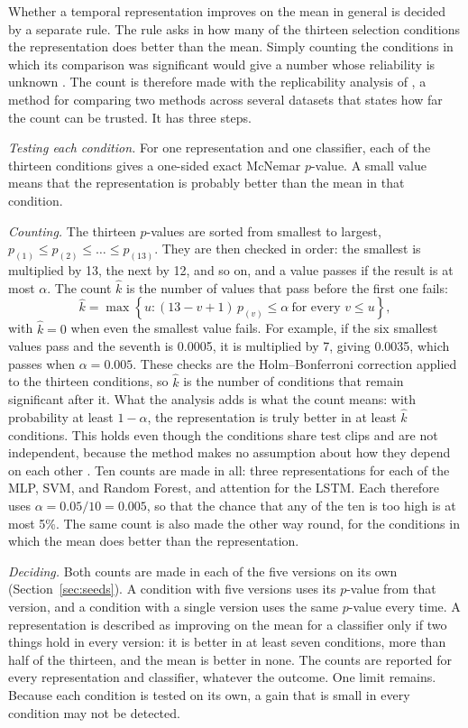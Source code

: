 Whether a temporal representation improves on the mean in general is decided by a separate rule. The rule asks in how many of the thirteen selection conditions the representation does better than the mean. Simply counting the conditions in which its comparison was significant would give a number whose reliability is unknown \cite{demsar2006}. The count is therefore made with the replicability analysis of , a method for comparing two methods across several datasets that states how far the count can be trusted. It has three steps.

\emph{Testing each condition.} For one representation and one classifier, each of the thirteen conditions gives a one-sided exact McNemar $p$-value. A small value means that the representation is probably better than the mean in that condition.

\emph{Counting.} The thirteen $p$-values are sorted from smallest to largest, $p_{(1)} \le p_{(2)} \le \dots \le p_{(13)}$. They are then checked in order: the smallest is multiplied by 13, the next by 12, and so on, and a value passes if the result is at most $\alpha$. The count $\hat{k}$ is the number of values that pass before the first one fails:
\begin{equation}
   \hat{k} = \max \left\{ u : (13 - v + 1)\, p_{(v)} \le \alpha \ \text{for every } v \le u \right\},
   \label{eq:replicability}
\end{equation}
with $\hat{k} = 0$ when even the smallest value fails. For example, if the six smallest values pass and the seventh is 0.0005, it is multiplied by 7, giving 0.0035, which passes when $\alpha = 0.005$. These checks are the Holm--Bonferroni correction applied to the thirteen conditions, so $\hat{k}$ is the number of conditions that remain significant after it. What the analysis adds is what the count means: with probability at least $1 - \alpha$, the representation is truly better in at least $\hat{k}$ conditions. This holds even though the conditions share test clips and are not independent, because the method makes no assumption about how they depend on each other \cite{dror2017}. Ten counts are made in all: three representations for each of the MLP, SVM, and Random Forest, and attention for the LSTM. Each therefore uses $\alpha = 0.05/10 = 0.005$, so that the chance that any of the ten is too high is at most 5\%. The same count is also made the other way round, for the conditions in which the mean does better than the representation.

\emph{Deciding.} Both counts are made in each of the five versions on its own (Section~\ref{sec:seeds}). A condition with five versions uses its $p$-value from that version, and a condition with a single version uses the same $p$-value every time. A representation is described as improving on the mean for a classifier only if two things hold in every version: it is better in at least seven conditions, more than half of the thirteen, and the mean is better in none. The counts are reported for every representation and classifier, whatever the outcome. One limit remains. Because each condition is tested on its own, a gain that is small in every condition may not be detected.

